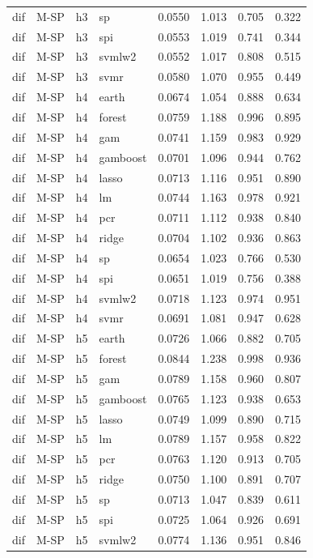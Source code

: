 \begin{ThreePartTable}
\begin{longtable}[t]{llclcccc}
dif & M-SP & h3 & sp & 0.0550 & 1.013 & 0.705 & 0.322\\
dif & M-SP & h3 & spi & 0.0553 & 1.019 & 0.741 & 0.344\\
dif & M-SP & h3 & svmlw2 & 0.0552 & 1.017 & 0.808 & 0.515\\
dif & M-SP & h3 & svmr & 0.0580 & 1.070 & 0.955 & 0.449\\
\addlinespace
dif & M-SP & h4 & earth & 0.0674 & 1.054 & 0.888 & 0.634\\
dif & M-SP & h4 & forest & 0.0759 & 1.188 & 0.996 & 0.895\\
dif & M-SP & h4 & gam & 0.0741 & 1.159 & 0.983 & 0.929\\
dif & M-SP & h4 & gamboost & 0.0701 & 1.096 & 0.944 & 0.762\\
dif & M-SP & h4 & lasso & 0.0713 & 1.116 & 0.951 & 0.890\\
dif & M-SP & h4 & lm & 0.0744 & 1.163 & 0.978 & 0.921\\
dif & M-SP & h4 & pcr & 0.0711 & 1.112 & 0.938 & 0.840\\
dif & M-SP & h4 & ridge & 0.0704 & 1.102 & 0.936 & 0.863\\
dif & M-SP & h4 & sp & 0.0654 & 1.023 & 0.766 & 0.530\\
dif & M-SP & h4 & spi & 0.0651 & 1.019 & 0.756 & 0.388\\
dif & M-SP & h4 & svmlw2 & 0.0718 & 1.123 & 0.974 & 0.951\\
dif & M-SP & h4 & svmr & 0.0691 & 1.081 & 0.947 & 0.628\\
\addlinespace
dif & M-SP & h5 & earth & 0.0726 & 1.066 & 0.882 & 0.705\\
dif & M-SP & h5 & forest & 0.0844 & 1.238 & 0.998 & 0.936\\
dif & M-SP & h5 & gam & 0.0789 & 1.158 & 0.960 & 0.807\\
dif & M-SP & h5 & gamboost & 0.0765 & 1.123 & 0.938 & 0.653\\
dif & M-SP & h5 & lasso & 0.0749 & 1.099 & 0.890 & 0.715\\
dif & M-SP & h5 & lm & 0.0789 & 1.157 & 0.958 & 0.822\\
dif & M-SP & h5 & pcr & 0.0763 & 1.120 & 0.913 & 0.705\\
dif & M-SP & h5 & ridge & 0.0750 & 1.100 & 0.891 & 0.707\\
dif & M-SP & h5 & sp & 0.0713 & 1.047 & 0.839 & 0.611\\
dif & M-SP & h5 & spi & 0.0725 & 1.064 & 0.926 & 0.691\\
dif & M-SP & h5 & svmlw2 & 0.0774 & 1.136 & 0.951 & 0.846\\

\end{longtable}
\end{ThreePartTable}
